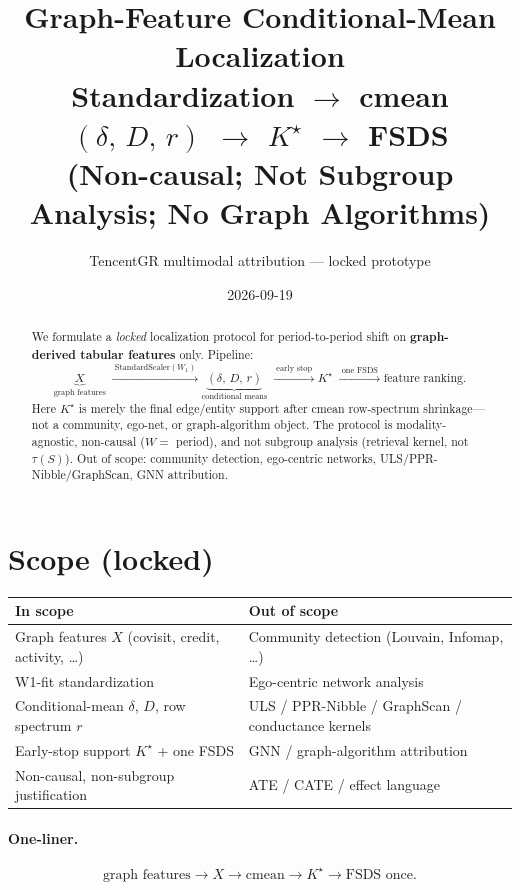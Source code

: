 \documentclass[11pt]{article}
\title{\textbf{Graph-Feature Conditional-Mean Localization}\\
\large Standardization $\to$ cmean $(\delta,\,D,\,r)$ $\to$ $K^\star$ $\to$ FSDS\\
\large (Non-causal; Not Subgroup Analysis; No Graph Algorithms)}
\author{TencentGR multimodal attribution --- locked prototype}
\date{2026-09-19}
\begin{document}
\maketitle

\begin{abstract}
We formulate a \emph{locked} localization protocol for period-to-period
shift on \textbf{graph-derived tabular features} only.
Pipeline:
\[
  \underbrace{X}_{\text{graph features}}
  \;\xrightarrow{\;\mathrm{StandardScaler}(W_1)\;}
  \underbrace{(\delta,\,D,\,r)}_{\text{conditional means}}
  \;\xrightarrow{\;\text{early stop}\;}
  K^\star
  \;\xrightarrow{\;\text{one FSDS}\;}
  \text{feature ranking}.
\]
Here \(K^\star\) is merely the final edge/entity support after cmean
row-spectrum shrinkage---not a community, ego-net, or graph-algorithm
object. The protocol is modality-agnostic, non-causal
(\(W=\) period), and not subgroup analysis (retrieval kernel, not
\(\tau(S)\)). Out of scope: community detection, ego-centric networks,
ULS/PPR-Nibble/GraphScan, GNN attribution.
\end{abstract}

\tableofcontents
\vspace{1em}

\section{Scope (locked)}
\label{sec:scope}

\begin{center}
\begin{tabular}{@{}ll@{}}
\toprule
\textbf{In scope} & \textbf{Out of scope} \\
\midrule
Graph features $X$ (covisit, credit, activity, \ldots)
  & Community detection (Louvain, Infomap, \ldots) \\
W1-fit standardization & Ego-centric network analysis \\
Conditional-mean $\delta$, $D$, row spectrum $r$
  & ULS / PPR-Nibble / GraphScan / conductance kernels \\
Early-stop support $K^\star$ + one FSDS
  & GNN / graph-algorithm attribution \\
Non-causal, non-subgroup justification
  & ATE / CATE / effect language \\
\bottomrule
\end{tabular}
\end{center}

\paragraph{One-liner.}
\[
  \text{graph features}\to X\to\text{cmean}\to K^\star\to\text{FSDS once}.
\]
\end{document}
